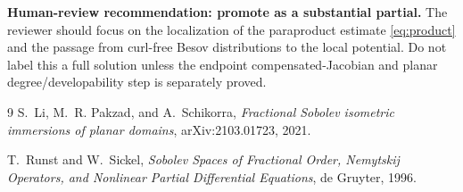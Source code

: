 \documentclass[11pt]{article}
\begin{document}
\textbf{Human-review recommendation: promote as a substantial partial.}
The reviewer should focus on the localization of the paraproduct estimate
\eqref{eq:product} and the passage from curl-free Besov distributions to the
local potential.  Do not label this a full solution unless the endpoint
compensated-Jacobian and planar degree/developability step is separately
proved.

\begin{thebibliography}{9}
S.~Li, M.~R. Pakzad, and A.~Schikorra,
\emph{Fractional Sobolev isometric immersions of planar domains},
arXiv:2103.01723, 2021.

T.~Runst and W.~Sickel,
\emph{Sobolev Spaces of Fractional Order, Nemytskij Operators, and Nonlinear
Partial Differential Equations}, de Gruyter, 1996.
\end{thebibliography}
\end{document}
